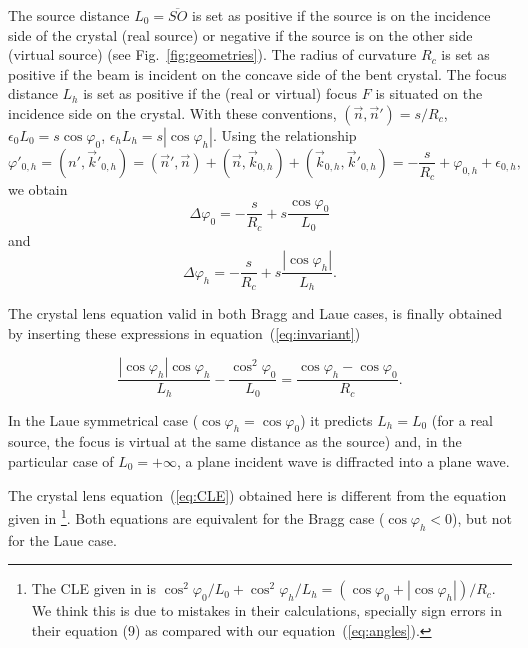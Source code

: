 \documentclass[preprint]{iucr}              %
\newcommand{\inred}[1]{{\color{red}#1}}
\begin{document}
The source distance $L_0=\overline{SO}$ is set as positive if the source is on the incidence side of the crystal (real source) or negative if the source is on the other side (virtual source) (see Fig.~\ref{fig:geometries}). The radius of curvature $R_c$ is set as positive if the beam is incident on the concave side of the bent crystal. The focus distance $L_h$ is set as positive if the \inred{(}real or virtual\inred{)} focus \inred{$F$} is situated on the incidence side on the crystal. With these conventions, $(\vec n,\vec n')=s/R_c$, $\epsilon_0 L_0 = s \cos\varphi_0$,  $\epsilon_h L_h = s |\cos\varphi_h|$. Using the relationship
\begin{equation}
    \varphi'_{0,h} = 
    (n',  \vec k'_{0,h}) = 
    (\vec n', \vec n) + (\vec n,\vec k_{0,h}) + (\vec k_{0,h}, \vec k'_{0,h}) = -\frac{s}{R_c} + \varphi_{0,h} + \epsilon_{0,h},
\end{equation}
we obtain
\begin{equation}
\label{eq:angles}
\Delta \varphi_0 =  - \frac{s}{R_c} + s \frac{\cos\varphi_0}{L_0}
\end{equation}
and 
\begin{equation}
\label{eq:angles2}
\Delta \varphi_h = - \frac{s}{R_c} +  s \frac{|\cos\varphi_h|}{L_h}.
\end{equation}

The crystal lens equation \inred{valid in both Bragg and Laue cases,} is finally obtained by inserting these expressions in equation~(\ref{eq:invariant})

\begin{equation}
\label{eq:CLE}
\frac{|\cos\varphi_h| \cos\varphi_h}{L_h} - \frac{\cos^2\varphi_0}{L_0} = \frac{\cos\varphi_h - \cos\varphi_0}{R_c}.
\end{equation}


In the Laue symmetrical case ($\cos\varphi_h=\cos\varphi_0$) it predicts $L_h=L_0$ (for a real source, the focus is virtual at the same distance as the source) and, in the particular case of $L_0=+\infty$, a plane incident wave is diffracted into a plane wave.

The crystal lens equation~(\ref{eq:CLE}) obtained here is different from the equation given in \cite{CK}\footnote{The CLE \inred{given} in \cite{CK} is 
\inred{$
\cos^2\varphi_0/L_0 + \cos^2\varphi_h/L_h = (\cos\varphi_0 + |\cos\varphi_h|)/R_c$}.
We think this is due to mistakes in their calculations, specially sign errors in their equation (9) as compared with our equation~(\ref{eq:angles}). 
}.
Both equations are equivalent for the Bragg case ($\cos\varphi_h<0$), but not for the Laue case.
\end{document}
